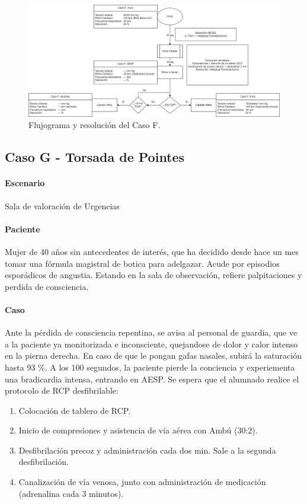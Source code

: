 \begin{figure}[hptb]
    \centering
	\includegraphics[width=\linewidth]{./imagenes/ACV-AdSC-CasosUCI_CasoF.png}
	\caption{\label{fig:Brusilov:SVI:CasoD}Flujograma y resolución del Caso F.}
\end{figure}


\subsection{Caso G - Torsada de Pointes}
\paragraph{Escenario} Sala de valoración de Urgencias
\vspace{-12.5pt}
\paragraph{Paciente} Mujer de 40 años sin antecedentes de interés, que ha decidido desde hace un mes tomar una fórmula magistral de botica para adelgazar. Acude por episodios esporádicos de angustia. Estando en la sala de observación, refiere palpitaciones y perdida de consciencia.
\vspace{-12.5pt}
\paragraph{Caso} Ante la pérdida de consciencia repentina, se avisa al personal de guardia, que ve a la paciente ya monitorizada e inconsciente, quejandose de dolor y calor intenso en la pierna derecha. En caso de que le pongan gafas nasales, subirá la saturación hasta 93 \%. A los 100 segundos, la paciente pierde la conciencia y experiementa una bradicardia intensa, entrando en AESP. Se espera que el alumnado realice el protocolo de RCP desfibrilable:
\begin{enumerate}[topsep=0pt, partopsep=0pt,itemsep=0pt,parsep=0pt]
    \item Colocación de tablero de RCP.
    \item Inicio de compresiones y asistencia de vía aérea con Ambú (30:2).
    \item Desfibrilación precoz y administración cada dos min. Sale a la segunda desfibrilación.
    \item Canalización de vía venosa, junto con administración de medicación (adrenalina cada 3 minutos).
\end{enumerate}
\vspace{-12.5pt}
